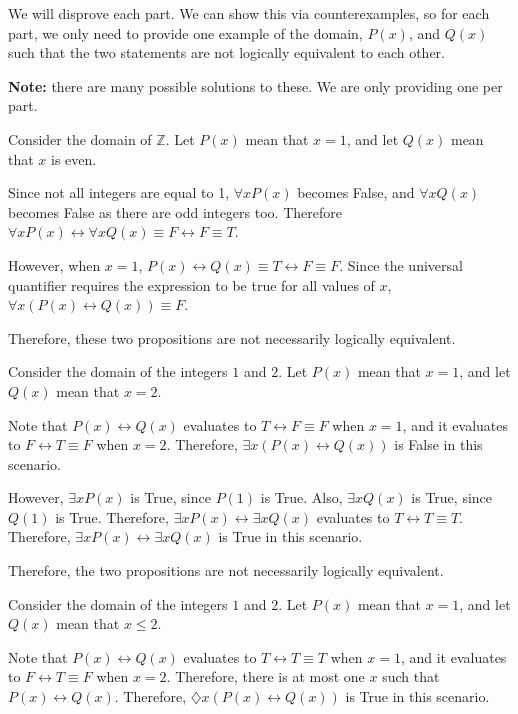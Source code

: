 \documentclass[12pt]{exam}
\begin{document}
\begin{solution}
We will disprove each part. We can show this via counterexamples, so for each part, we only need to provide one example of the domain, $P(x)$, and $Q(x)$ such that the two statements are not logically equivalent to each other.

\textbf{Note:} there are many possible solutions to these. We are only providing one per part.

\begin{qparts}
\item Consider the domain of $\mathbb{Z}$. Let $P(x)$ mean that $x = 1$, and let $Q(x)$ mean that $x$ is even.

Since not all integers are equal to 1, $\forall x P(x)$ becomes False, and $\forall x Q(x)$ becomes False as there are odd integers too. Therefore $\forall x P(x) \leftrightarrow \forall x Q(x) \equiv F \leftrightarrow F \equiv T$.

However, when $x = 1$, $P(x) \leftrightarrow Q(x) \equiv T \leftrightarrow F \equiv F$. Since the universal quantifier requires the expression to be true for all values of $x$, $\forall x(P(x) \leftrightarrow Q(x)) \equiv F$.

Therefore, these two propositions are not necessarily logically equivalent.

\item Consider the domain of the integers $1$ and $2$. Let $P(x)$ mean that $x = 1$, and let $Q(x)$ mean that $x = 2$.

Note that $P(x) \leftrightarrow Q(x)$ evaluates to $T \leftrightarrow F \equiv F$ when $x = 1$, and it evaluates to $F \leftrightarrow T \equiv F$ when $x = 2$. Therefore, $\exists x(P(x) \leftrightarrow Q(x))$ is False in this scenario.

However, $\exists x P(x)$ is True, since $P(1)$ is True. Also, $\exists x Q(x)$ is True, since $Q(1)$ is True. Therefore, $\exists x P(x) \leftrightarrow \exists x Q(x)$ evaluates to $T \leftrightarrow T \equiv T$. Therefore, $\exists x P(x) \leftrightarrow \exists x Q(x)$ is True in this scenario.

Therefore, the two propositions are not necessarily logically equivalent.

\item Consider the domain of the integers $1$ and $2$. Let $P(x)$ mean that $x = 1$, and let $Q(x)$ mean that $x \leq 2$.

Note that $P(x) \leftrightarrow Q(x)$ evaluates to $T \leftrightarrow T \equiv T$ when $x = 1$, and it evaluates to $F \leftrightarrow T \equiv F$ when $x = 2$. Therefore, there is at most one $x$ such that $P(x) \leftrightarrow Q(x)$. Therefore, $\diamondsuit x(P(x) \leftrightarrow Q(x))$ is True in this scenario.


\end{qparts}
\end{solution}
\end{document}
